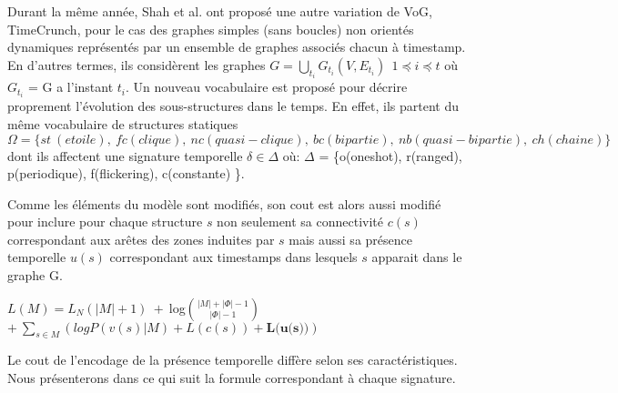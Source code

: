 Durant la même année, Shah et al.\citep{shah2015timecrunch} ont proposé une autre variation de VoG, TimeCrunch, pour le cas des graphes simples (sans boucles) non orientés dynamiques représentés par un ensemble de graphes associés chacun à timestamp. En d'autres termes, ils considèrent les graphes $\displaystyle{G=\bigcup_{t_{i}}G_{t_{i}}(V,E_{t_{i}})}\ \ 1 \preceq i \preceq t$ où $G_{t_{i}}$ = G a l'instant $t_{i}$.
			Un nouveau vocabulaire est proposé pour décrire proprement l'évolution des sous-structures dans le temps. En effet, ils partent du même vocabulaire de structures statiques 
			$\Omega =\{ st\ (etoile),\ fc (clique),\ nc (quasi-clique),\ bc (bipartie),\ nb (quasi-bipartie),\ ch (chaine)\}$ 
			dont ils affectent une signature temporelle $\delta \in \Delta$ où: $\Delta$ = \{o(oneshot), r(ranged), p(periodique), f(flickering), c(constante) \}. 
			
			 Comme les éléments du modèle sont modifiés, son cout est alors aussi modifié pour inclure pour chaque structure $s$ non seulement sa connectivité $c(s)$ correspondant aux arêtes des zones induites par $s$ mais aussi sa présence temporelle $u(s)$ correspondant aux timestamps dans lesquels $s$ apparait dans le graphe G. 
			 
			 $L(M) = L_{N}(|M|+1)\ +\ $log${|M|+|\Phi|-1}\choose{|\Phi|-1}$ $+\ \displaystyle{\sum_{s\in M}(logP(v(s)|M) + L(c(s)) + \textbf{L(u(s))})}$
			 
			 Le cout de l'encodage de la présence temporelle diffère selon ses caractéristiques. Nous présenterons dans ce qui suit la formule correspondant à chaque signature.

